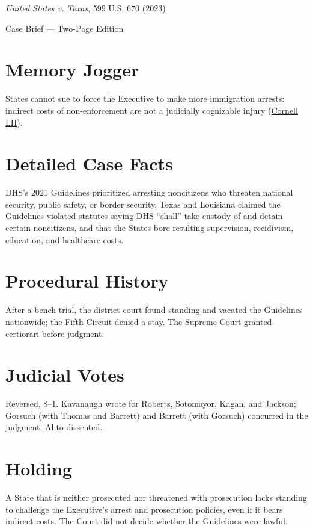 \documentclass[12pt]{article}
\begin{document}
\begin{center}
{\LARGE \textit{United States v. Texas}, 599 U.S. 670 (2023)\par}
\vspace{0.5em}
{\large Case Brief --- Two-Page Edition\par}
\end{center}

\section{Memory Jogger}
States cannot sue to force the Executive to make more immigration arrests: indirect costs of non-enforcement are not a judicially cognizable injury (\href{https://www.law.cornell.edu/supremecourt/text/22-58}{Cornell LII}).

\section{Detailed Case Facts}
DHS's 2021 Guidelines prioritized arresting noncitizens who threaten national security, public safety, or border security. Texas and Louisiana claimed the Guidelines violated statutes saying DHS ``shall'' take custody of and detain certain noncitizens, and that the States bore resulting supervision, recidivism, education, and healthcare costs.

\section{Procedural History}
After a bench trial, the district court found standing and vacated the Guidelines nationwide; the Fifth Circuit denied a stay. The Supreme Court granted certiorari before judgment.

\section{Judicial Votes}
Reversed, 8--1. Kavanaugh wrote for Roberts, Sotomayor, Kagan, and Jackson; Gorsuch (with Thomas and Barrett) and Barrett (with Gorsuch) concurred in the judgment; Alito dissented.

\section{Holding}
A State that is neither prosecuted nor threatened with prosecution lacks standing to challenge the Executive's arrest and prosecution policies, even if it bears indirect costs. The Court did not decide whether the Guidelines were lawful.
\end{document}
